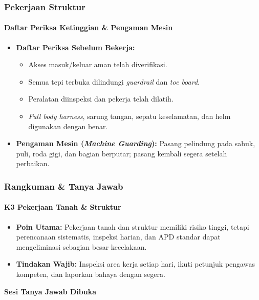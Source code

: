 \documentclass[../main.tex]{subfiles}
\begin{document}
\begin{frame}[mytitle=imageplus,t,mycolor=white,light]
	\frametitle{Pekerjaan Struktur}
	\framesubtitle{Daftar Periksa Ketinggian \& Pengaman Mesin}
	\begin{itemize}
		\item \textbf{Daftar Periksa Sebelum Bekerja:}
		      \begin{itemize}
			      \item Akses masuk/keluar aman telah diverifikasi.
			      \item Semua tepi terbuka dilindungi \textit{guardrail} dan \textit{toe board}.
			      \item Peralatan diinspeksi dan pekerja telah dilatih.
			      \item \textit{Full body harness}, sarung tangan, sepatu keselamatan, dan helm digunakan dengan benar.
		      \end{itemize}
		\item \textbf{Pengaman Mesin (\textit{Machine Guarding}):} Pasang pelindung pada sabuk, puli, roda gigi, dan bagian berputar; pasang kembali segera setelah perbaikan.
	\end{itemize}
\end{frame}

\begin{frame}[mytitle=center,c,mycolor=digiPH_darkblue,dark]
	\frametitle{Rangkuman \& Tanya Jawab}
	\framesubtitle{K3 Pekerjaan Tanah \& Struktur}
	\begin{itemize}
		\item \textbf{Poin Utama:} Pekerjaan tanah dan struktur memiliki risiko tinggi, tetapi perencanaan sistematis, inspeksi harian, dan APD standar dapat mengeliminasi sebagian besar kecelakaan.
		\item \textbf{Tindakan Wajib:} Inspeksi area kerja setiap hari, ikuti petunjuk pengawas kompeten, dan laporkan bahaya dengan segera.
	\end{itemize}
	\vspace{1em}
	\centering
	\Large \textbf{Sesi Tanya Jawab Dibuka}
\end{frame}
\end{document}
